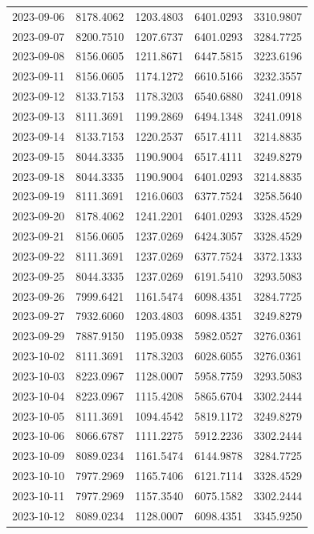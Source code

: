 \begin{footnotesize}
\begin{longtable}{lllll}
2023-09-06 & 8178.4062 & 1203.4803 & 6401.0293 & 3310.9807 \\
2023-09-07 & 8200.7510 & 1207.6737 & 6401.0293 & 3284.7725 \\
2023-09-08 & 8156.0605 & 1211.8671 & 6447.5815 & 3223.6196 \\
2023-09-11 & 8156.0605 & 1174.1272 & 6610.5166 & 3232.3557 \\
2023-09-12 & 8133.7153 & 1178.3203 & 6540.6880 & 3241.0918 \\
2023-09-13 & 8111.3691 & 1199.2869 & 6494.1348 & 3241.0918 \\
2023-09-14 & 8133.7153 & 1220.2537 & 6517.4111 & 3214.8835 \\
2023-09-15 & 8044.3335 & 1190.9004 & 6517.4111 & 3249.8279 \\
2023-09-18 & 8044.3335 & 1190.9004 & 6401.0293 & 3214.8835 \\
2023-09-19 & 8111.3691 & 1216.0603 & 6377.7524 & 3258.5640 \\
2023-09-20 & 8178.4062 & 1241.2201 & 6401.0293 & 3328.4529 \\
2023-09-21 & 8156.0605 & 1237.0269 & 6424.3057 & 3328.4529 \\
2023-09-22 & 8111.3691 & 1237.0269 & 6377.7524 & 3372.1333 \\
2023-09-25 & 8044.3335 & 1237.0269 & 6191.5410 & 3293.5083 \\
2023-09-26 & 7999.6421 & 1161.5474 & 6098.4351 & 3284.7725 \\
2023-09-27 & 7932.6060 & 1203.4803 & 6098.4351 & 3249.8279 \\
2023-09-29 & 7887.9150 & 1195.0938 & 5982.0527 & 3276.0361 \\
2023-10-02 & 8111.3691 & 1178.3203 & 6028.6055 & 3276.0361 \\
2023-10-03 & 8223.0967 & 1128.0007 & 5958.7759 & 3293.5083 \\
2023-10-04 & 8223.0967 & 1115.4208 & 5865.6704 & 3302.2444 \\
2023-10-05 & 8111.3691 & 1094.4542 & 5819.1172 & 3249.8279 \\
2023-10-06 & 8066.6787 & 1111.2275 & 5912.2236 & 3302.2444 \\
2023-10-09 & 8089.0234 & 1161.5474 & 6144.9878 & 3284.7725 \\
2023-10-10 & 7977.2969 & 1165.7406 & 6121.7114 & 3328.4529 \\
2023-10-11 & 7977.2969 & 1157.3540 & 6075.1582 & 3302.2444 \\
2023-10-12 & 8089.0234 & 1128.0007 & 6098.4351 & 3345.9250 \\

\end{longtable}
\end{footnotesize}
